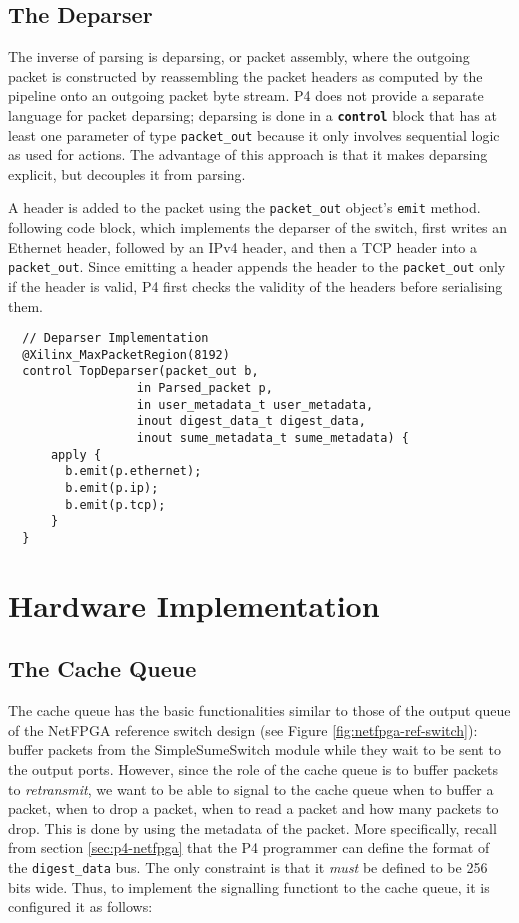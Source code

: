 	\subsection{The Deparser}
The inverse of parsing is deparsing, or packet assembly, where the outgoing packet is constructed by reassembling the packet headers as computed by the pipeline onto an outgoing packet byte stream. P4 does not provide a separate language for packet deparsing; deparsing is done in a \textbf{\texttt{control}} block that has at least one parameter of type \verb|packet_out| because it only involves sequential logic as used for actions. The advantage of this approach is that it makes deparsing explicit, but decouples it from parsing. 

A header is added to the packet using the \verb|packet_out| object's \texttt{emit} method. following code block, which implements the deparser of the switch, first writes an Ethernet header, followed by an IPv4 header, and then a TCP header into a \verb|packet_out|. Since emitting a header appends the header to the \verb|packet_out| only if the header is valid, P4 first checks the validity of the headers before serialising them.

{\renewcommand{\baselinestretch}{0.8}\small
\begin{verbatim}
  // Deparser Implementation
  @Xilinx_MaxPacketRegion(8192)
  control TopDeparser(packet_out b,
                  in Parsed_packet p,
                  in user_metadata_t user_metadata,
                  inout digest_data_t digest_data, 
                  inout sume_metadata_t sume_metadata) { 
      apply {
        b.emit(p.ethernet); 
        b.emit(p.ip);
        b.emit(p.tcp);
      }
  }
\end{verbatim}
}

\section{Hardware Implementation}
	\label{sec:cachequeue}
	\subsection{The Cache Queue}
The cache queue has the basic functionalities similar to those of the output queue of the NetFPGA reference switch design (see Figure \ref{fig:netfpga-ref-switch}): buffer packets from the SimpleSumeSwitch module while they wait to be sent to the output ports. However, since the role of the cache queue is to buffer packets to \textit{retransmit}, we want to be able to signal to the cache queue when to buffer a packet, when to drop a packet, when to read a packet and how many packets to drop. This is done by using the metadata of the packet. More specifically, recall from section \ref{sec:p4-netfpga} that the P4 programmer can define the format of the \verb|digest_data| bus. The only constraint is that it \textit{must} be defined to be 256 bits wide. Thus, to implement the signalling functiont to the cache queue, it is configured it as follows:

